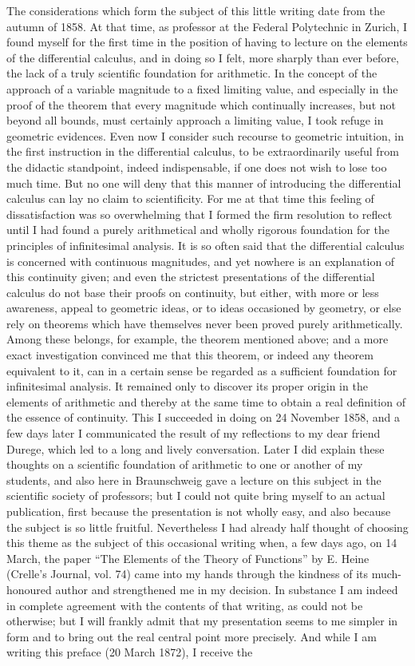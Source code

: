 \documentclass[11pt]{article}
\begin{document}
The considerations which form the subject of this little writing date from the autumn of 1858. At that time, as professor at the Federal Polytechnic in Zurich, I found myself for the first time in the position of having to lecture on the elements of the differential calculus, and in doing so I felt, more sharply than ever before, the lack of a truly scientific foundation for arithmetic. In the concept of the approach of a variable magnitude to a fixed limiting value, and especially in the proof of the theorem that every magnitude which continually increases, but not beyond all bounds, must certainly approach a limiting value, I took refuge in geometric evidences. Even now I consider such recourse to geometric intuition, in the first instruction in the differential calculus, to be extraordinarily useful from the didactic standpoint, indeed indispensable, if one does not wish to lose too much time. But no one will deny that this manner of introducing the differential calculus can lay no claim to scientificity. For me at that time this feeling of dissatisfaction was so overwhelming that I formed the firm resolution to reflect until I had found a purely arithmetical and wholly rigorous foundation for the principles of infinitesimal analysis. It is so often said that the differential calculus is concerned with continuous magnitudes, and yet nowhere is an explanation of this continuity given; and even the strictest presentations of the differential calculus do not base their proofs on continuity, but either, with more or less awareness, appeal to geometric ideas, or to ideas occasioned by geometry, or else rely on theorems which have themselves never been proved purely arithmetically. Among these belongs, for example, the theorem mentioned above; and a more exact investigation convinced me that this theorem, or indeed any theorem equivalent to it, can in a certain sense be regarded as a sufficient foundation for infinitesimal analysis. It remained only to discover its proper origin in the elements of arithmetic and thereby at the same time to obtain a real definition of the essence of continuity. This I succeeded in doing on 24 November 1858, and a few days later I communicated the result of my reflections to my dear friend Durege, which led to a long and lively conversation. Later I did explain these thoughts on a scientific foundation of arithmetic to one or another of my students, and also here in Braunschweig gave a lecture on this subject in the scientific society of professors; but I could not quite bring myself to an actual publication, first because the presentation is not wholly easy, and also because the subject is so little fruitful. Nevertheless I had already half thought of choosing this theme as the subject of this occasional writing when, a few days ago, on 14 March, the paper ``The Elements of the Theory of Functions'' by E. Heine (Crelle's Journal, vol. 74) came into my hands through the kindness of its much-honoured author and strengthened me in my decision. In substance I am indeed in complete agreement with the contents of that writing, as could not be otherwise; but I will frankly admit that my presentation seems to me simpler in form and to bring out the real central point more precisely. And while I am writing this preface (20 March 1872), I receive the 
\end{document}
